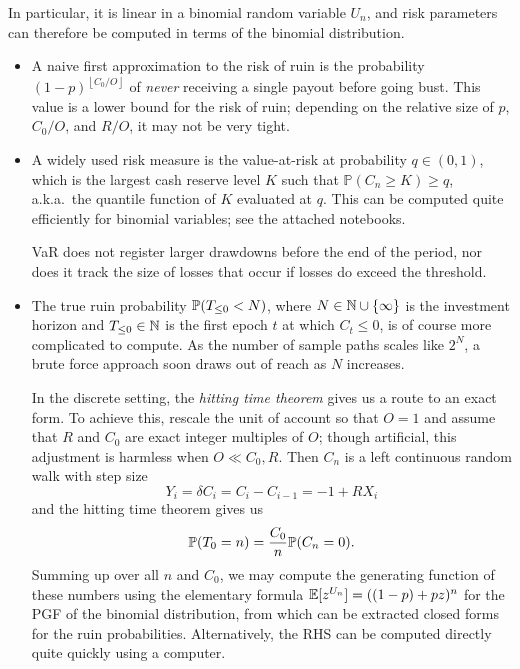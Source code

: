 In particular, it is linear in a binomial random variable $U_n$, and risk parameters can therefore be computed in terms of the binomial distribution.

\begin{itemize}
  \item A naive first approximation to the risk of ruin is the probability $(1-p)^{\left\lfloor C_0/O \right\rfloor}$ of \emph{never} receiving a single payout before going bust.
  This value is a lower bound for the risk of ruin; depending on the relative size of $p$, $C_0/O$, and $R/O$, it may not be very tight.

  \item A widely used risk measure is the value-at-risk at probability $q\in(0,1)$, which is the largest cash reserve level $K$ such that $\mathbb{P}(C_n\geq K)\geq q$, a.k.a.~the quantile function of $K$ evaluated at $q$.
  This can be computed quite efficiently for binomial variables; see the attached notebooks.
  
  VaR does not register larger drawdowns before the end of the period, nor does it track the size of losses that occur if losses do exceed the threshold.
  
  \item 
    The true ruin probability $\mathbb{P}(T_{\leq 0}<N)$, where $N\in\mathbb{N}\cup\{\infty\}$ is the investment horizon and $T_{\leq 0}\in\mathbb{N}$ is the first epoch $t$ at which $C_t\leq 0$, is of course more complicated to compute.
    As the number of sample paths scales like $2^N$, a brute force approach soon draws out of reach as $N$ increases.

    In the discrete setting, the \emph{hitting time theorem} gives us a route to an exact form.
    To achieve this, rescale the unit of account so that $O=1$ and assume that $R$ and $C_0$ are exact integer multiples of $O$; though artificial, this adjustment is harmless when $O\ll C_0,R$.
    Then $C_n$ is a left continuous random walk with step size 
    $$Y_i = \delta C_i = C_i - C_{i-1} = - 1 + RX_i$$ and the hitting time theorem gives us
    \[
      \mathbb{P}(T_0 = n) = \frac{C_0}{n}\mathbb{P}(C_n = 0).
    \]
    Summing up over all $n$ and $C_0$, we may compute the generating function of these numbers using the elementary formula $\mathbb{E}[z^{U_n}] = ((1-p) + pz)^n$ for the PGF of the binomial distribution, from which can be extracted closed forms for the ruin probabilities.
    Alternatively, the RHS can be computed directly quite quickly using a computer.    

\end{itemize}


